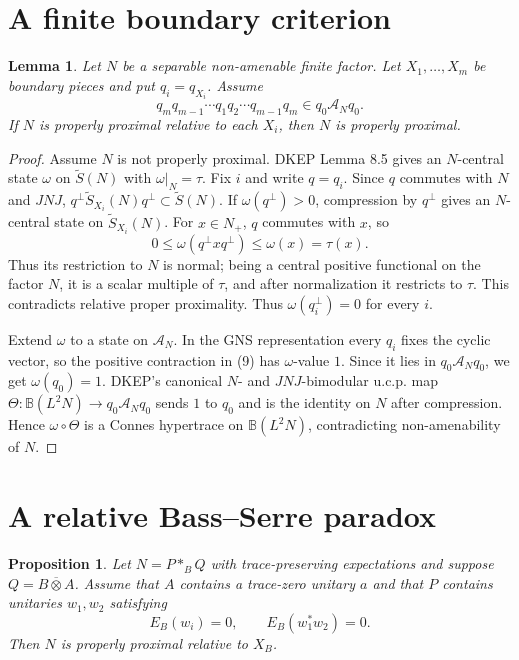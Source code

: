 \documentclass[12pt]{article}
\newtheorem{lemma}{Lemma}
\newtheorem{proposition}{Proposition}
\newcommand{\bbarotimes}{\mathbin{\overline{\otimes}}}
\newcommand{\cA}{\mathcal A}
\begin{document}
\section*{A finite boundary criterion}

\begin{lemma}\label{lem:finite}
Let \(N\) be a separable non-amenable finite factor.  Let \(X_1,\ldots,X_m\) be
boundary pieces and put \(q_i=q_{X_i}\).  Assume
\[
        q_mq_{m-1}\cdots q_1q_2\cdots q_{m-1}q_m\in q_0\cA_Nq_0.  \tag{9}
\]
If \(N\) is properly proximal relative to each \(X_i\), then \(N\) is properly
proximal.
\end{lemma}

\begin{proof}
Assume \(N\) is not properly proximal.  DKEP Lemma 8.5 gives an \(N\)-central
state \(\omega\) on \(\widetilde S(N)\) with \(\omega|_N=\tau\).  Fix \(i\) and
write \(q=q_i\).  Since \(q\) commutes with \(N\) and \(JNJ\),
\(q^\perp\widetilde S_{X_i}(N)q^\perp\subset\widetilde S(N)\).  If
\(\omega(q^\perp)>0\), compression by \(q^\perp\) gives an \(N\)-central state
on \(\widetilde S_{X_i}(N)\).  For \(x\in N_+\), \(q\) commutes with \(x\), so
\[
0\le \omega(q^\perp xq^\perp)\le \omega(x)=\tau(x).
\]
Thus its restriction to \(N\) is normal; being a central positive functional on
the factor \(N\), it is a scalar multiple of \(\tau\), and after normalization
it restricts to \(\tau\).  This contradicts relative proper proximality.  Thus
\(\omega(q_i^\perp)=0\) for every \(i\).

Extend \(\omega\) to a state on \(\cA_N\).  In the GNS representation every
\(q_i\) fixes the cyclic vector, so the positive contraction in (9) has
\(\omega\)-value \(1\).  Since it lies in \(q_0\cA_Nq_0\), we get
\(\omega(q_0)=1\).  DKEP's canonical \(N\)- and \(JNJ\)-bimodular u.c.p. map
\(\Theta:\mathbb B(L^2N)\to q_0\cA_Nq_0\) sends \(1\) to \(q_0\) and is the
identity on \(N\) after compression.  Hence \(\omega\circ\Theta\) is a Connes
hypertrace on \(\mathbb B(L^2N)\), contradicting non-amenability of \(N\).
\end{proof}

\section*{A relative Bass--Serre paradox}

\begin{proposition}\label{prop:BS}
Let \(N=P*_{B}Q\) with trace-preserving expectations and suppose
\(Q=B\bbarotimes A\).  Assume that \(A\) contains a trace-zero unitary \(a\) and
that \(P\) contains unitaries \(w_1,w_2\) satisfying
\[
        E_B(w_i)=0,\qquad E_B(w_1^*w_2)=0 .
\]
Then \(N\) is properly proximal relative to \(X_B\).
\end{proposition}
\end{document}
